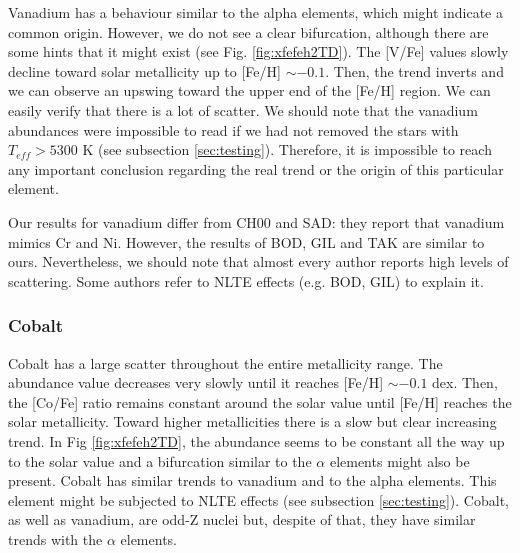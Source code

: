 \documentclass[oldversion]{aa}
\begin{document}
Vanadium has a behaviour similar to the alpha elements, which might indicate a common origin. However, we do not see a clear bifurcation, although there are some hints that it might exist (see Fig. \ref{fig:xfefeh2TD}). The [V/Fe] values slowly decline toward solar metallicity up to [Fe/H] $\sim -0.1$. Then, the trend inverts and we can observe an upswing toward the upper end of the [Fe/H] region. We can easily verify that there is a lot of scatter. We should note that the vanadium abundances were impossible to read if we had not removed the stars with $T_{eff}>5300$ K (see subsection \ref{sec:testing}). Therefore, it is impossible to reach any important conclusion regarding the real trend or the origin of this particular element.

Our results for vanadium differ from CH00 and SAD: they report that vanadium mimics Cr and Ni. However, the results of BOD, GIL and TAK are similar to ours. Nevertheless, we should note that almost every author reports high levels of scattering. Some authors refer to NLTE effects (e.g. BOD, GIL) to explain it.


\subsubsection {Cobalt}

Cobalt has a large scatter throughout the entire metallicity range. The abundance value decreases very slowly until it reaches [Fe/H] $\sim -0.1$ dex. Then, the [Co/Fe] ratio remains constant around the solar value until [Fe/H] reaches the solar metallicity. Toward higher metallicities there is a slow but clear increasing trend. In Fig \ref{fig:xfefeh2TD}, the abundance seems to be constant all the way up to the solar value and a bifurcation similar to the $\alpha$ elements might also be present. Cobalt has similar trends to vanadium and to the alpha elements. This element might be subjected to NLTE effects (see subsection \ref{sec:testing}). Cobalt, as well as vanadium, are odd-Z nuclei but, despite of that, they have similar trends with the  $\alpha$ elements.
\end{document}
